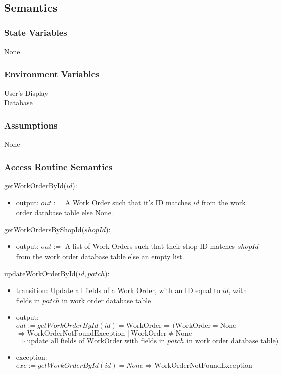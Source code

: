 \documentclass[12pt, titlepage]{article}
\begin{document}
\subsection{Semantics}

\subsubsection{State Variables}

None

\subsubsection{Environment Variables}

User's Display \\ Database

\subsubsection{Assumptions}

None

\subsubsection{Access Routine Semantics}
\noindent getWorkOrderById($id$):
\begin{itemize}
	\item output: $out :=$ A Work Order such that it's ID matches $id$ from the work order database table
	      else None.
\end{itemize}

\noindent getWorkOrdersByShopId($shopId$):
\begin{itemize}
	\item output: $out :=$ A list of Work Orders such that their shop ID matches $shopId$ from the work order
	      database table else an empty list.
\end{itemize}

\noindent updateWorkOrderById($id, patch$):
\begin{itemize}
	\item transition: Update all fields of a Work Order, with an ID equal to $id$, with fields in $patch$ in
	      work order database table
	\item output: $out := getWorkOrderById(id) = \text{WorkOrder} \Rightarrow (\text{WorkOrder} = \text{None}
		      $ \\ $\Rightarrow \text{WorkOrderNotFoundException } |\ \text{WorkOrder} \neq \text{None}$ \\
		      $\Rightarrow \text{update all fields of WorkOrder with fields in } patch \text{ in work order
			      database table})$
	\item exception: $exc := getWorkOrderById(id) = None \Rightarrow \text{WorkOrderNotFoundException}$
\end{itemize}
\end{document}
